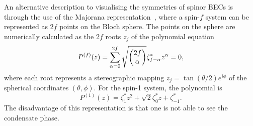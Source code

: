 An alternative description to visualising the symmetries of spinor BECs is
through the use of the Majorana representation~\cite{Majorana1932,Bloch1945},
where a spin-\(f\) system can be represented as \(2f\) points on the Bloch
sphere.
The points on the sphere are numerically calculated as the \(2f\) roots
\(z_j\) of the polynomial equation
\begin{equation}
    P^{(f)}(z) = \sum_{\alpha = 0}^{2f}
    \sqrt{\mqty(2f \\ \alpha)}\zeta_{f-\alpha}^*z^\alpha=0,
\end{equation}
where each root represents a stereographic mapping
\(z_j=\tan(\theta/2)e^{i\phi}\) of the spherical coordinates \((\theta, \phi)\).
For the spin-1 system, the polynomial is
\begin{equation}
    P^{(1)}(z) = \zeta_1^*z^2+\sqrt{2}\zeta_0^*z+\zeta_{-1}^*.
\end{equation}
The disadvantage of this representation is that one is not able to see the
condensate phase.

